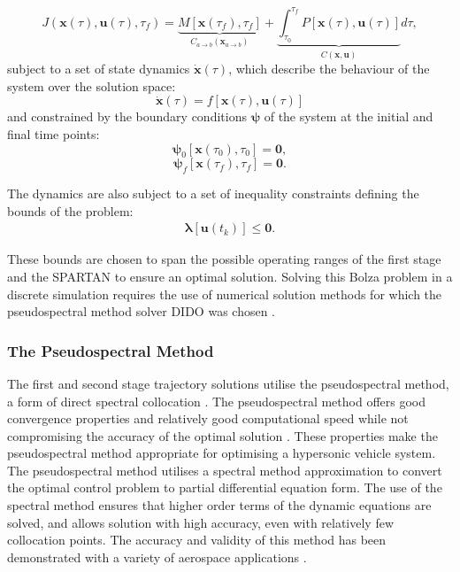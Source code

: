\documentclass[]{aiaa-tc}
\begin{document}
\begin{equation} \label{eq:cost}
J(\textbf{x}(\tau),\textbf{u}(\tau),\tau_f) = \underbrace{M[\textbf{x}(\tau_f),\tau_f]}_{C_{a\rightarrow b}(\textbf{x}_{a\rightarrow b})} +   \underbrace{\int_{\tau_0}^{\tau_f} P[\textbf{x}(\tau),\textbf{u}(\tau)]}_{C(\textbf{x},\textbf{u})} d\tau,
\end{equation}
subject to a set of state dynamics $\dot{\textbf{x}}(\tau)$, which describe the behaviour of the system over the solution space: 
\begin{equation} \label{eq:state}
\dot{\textbf{x}}(\tau) = f[\textbf{x}(\tau),\textbf{u}(\tau)]
\end{equation}
and constrained by the boundary conditions $\bm{\psi}$ of the system at the initial and final time points:
\begin{equation}
\bm{\psi}_0[\textbf{x}(\tau_0), \tau_0] = \textbf{0},
\end{equation}
\begin{equation} \label{eq:2}
\bm{\psi}_f[\textbf{x}(\tau_f), \tau_f] = \textbf{0}.
\end{equation}

The dynamics are also subject to a set of inequality constraints defining the bounds of the problem:
\begin{eqnarray}
\bm{\lambda}[\textbf{u}(t_k)] \leq \textbf{0}.
\end{eqnarray}

These bounds are chosen to span the possible operating ranges of the first stage and the SPARTAN to ensure an optimal solution. 
 Solving this Bolza problem in a discrete simulation requires the use of numerical solution methods for which the pseudospectral method solver DIDO was chosen \cite{Ross}.
 


\subsubsection{The Pseudospectral Method}
The first and second stage trajectory solutions utilise the pseudospectral method, a form of direct spectral collocation \cite{Fahroo2000}. The pseudospectral method offers good convergence properties and relatively good computational speed while not compromising the accuracy of the optimal solution \cite{Fasano2013}. These properties make the pseudospectral method appropriate for optimising a hypersonic vehicle system. 
The pseudospectral method utilises a spectral method approximation to convert the optimal control problem to partial differential equation form. The use of the spectral method ensures that higher order terms of the dynamic equations are solved, and allows solution with high accuracy, even with relatively few collocation points\cite{Fahroo1999}. The accuracy and validity of this method has been demonstrated with a variety of aerospace applications \cite{Bedrossian,Huntington2008,Josselyn2002,Yan2007}. 
\end{document}
